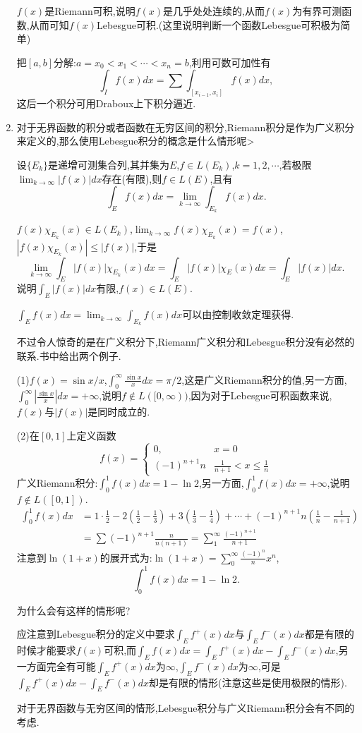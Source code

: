 \documentclass[12pt,a4paper,openany]{book}
\begin{document}
\begin{enumerate}
$f(x)$是Riemann可积,说明$f(x)$是几乎处处连续的,从而$f(x)$为有界可测函数,从而可知$f(x)$Lebesgue可积.(这里说明判断一个函数Lebesgue可积极为简单)

把$[a,b]$分解:$a=x_0<x_1<\cdots<x_n=b$,利用可数可加性有
\[
\int_{I}{f(x)dx} = \sum{\int_{[x_{i-1}, x_i]}{f(x)dx}},
\]
这后一个积分可用Draboux上下积分逼近.

\item 对于无界函数的积分或者函数在无穷区间的积分,Riemann积分是作为广义积分来定义的,那么使用Lebesgue积分的概念是什么情形呢>

设$\{E_k\}$是递增可测集合列,其并集为$E$,$f \in L(E_k)$,$k=1,2,\cdots$,若极限$\lim_{k \rightarrow \infty}{|f(x)|dx}$存在(有限),则$f \in L(E)$,且有
\[
\int_{E}{f(x)dx} = \lim_{k \rightarrow \infty}{\int_{E_k}{f(x)dx}}.
\]

$f(x)\chi_{E_k}(x) \in L(E_k)$,$\lim_{k \rightarrow \infty}{f(x)\chi_{E_k}(x)} = f(x)$,$|f(x)\chi_{E_k}(x)| \le |f(x)|$,于是
\[
\lim_{k \rightarrow \infty}{\int_{E}{|f(x)|\chi_{E_k}(x)dx}} = \int_{E}{|f(x)|\chi_{E}(x)dx}=\int_{E}{|f(x)|dx}.
\]
说明$\int_{E}{|f(x)|dx}$有限,$f(x) \in L(E)$.

$\int_{E}{f(x)dx} = \lim_{k \rightarrow \infty}{\int_{E_k}{f(x)dx}}$可以由控制收敛定理获得.

不过令人惊奇的是在广义积分下,Riemann广义积分和Lebesgue积分没有必然的联系.书中给出两个例子.

(1)$f(x)=\sin{x}/x$,$\int_{0}^{\infty}{\frac{\sin{x}}{x}dx} = \pi/2$,这是广义Riemann积分的值,另一方面,$\int_{0}^{\infty}{|\frac{\sin{x}}{x}|dx} = +\infty$,说明$f \notin L([0, \infty))$,因为对于Lebesgue可积函数来说,$f(x)$与$|f(x)|$是同时成立的.

(2)在$[0,1]$上定义函数
\[
f(x) = \begin{cases}
0, & x=0 \\
(-1)^{n+1}n & \frac{1}{n+1} < x \le \frac{1}{n}
\end{cases}
\]
广义Riemann积分:$\int_{0}^{1}{f(x)dx} = 1 - \ln{2}$,另一方面,$\int_{0}^{1}{f(x)dx} = +\infty$,说明$f \notin L([0,1])$.
\[
\begin{aligned}
\int_{0}^{1}{f(x)dx} &=1 \cdot \frac{1}{2} - 2(\frac{1}{2} - \frac{1}{3}) + 3(\frac{1}{3} - \frac{1}{4}) + \cdots + (-1)^{n+1}n(\frac{1}{n} - \frac{1}{n+1}) \\
&=\sum{(-1)^{n+1}\frac{n}{n(n+1)}}=\sum_{1}^{\infty}{\frac{(-1)^{n+1}}{n+1}}
\end{aligned}
\]
注意到$\ln{(1+x)}$的展开式为:$\ln{(1+x)} = \sum_{0}^{\infty}{\frac{(-1)^n}{n}x^n}$,
\[
\int_{0}^{1}{f(x)dx} = 1 - \ln{2}.
\]

为什么会有这样的情形呢?

应注意到Lebesgue积分的定义中要求$\int_{E}{f^+(x)dx}$与$\int_{E}{f^-(x)dx}$都是有限的时候才能要求$f(x)$可积,而$\int_{E}{f(x)dx} = \int_{E}{f^+(x)dx} - \int_{E}{f^-(x)dx}$,另一方面完全有可能$\int_{E}{f^+(x)dx}$为$\infty$,$\int_{E}{f^-(x)dx}$为$\infty$,可是$\int_{E}{f^+(x)dx} - \int_{E}{f^-(x)dx}$却是有限的情形(注意这些是使用极限的情形).

对于无界函数与无穷区间的情形,Lebesgue积分与广义Riemann积分会有不同的考虑.

\end{enumerate}
\end{document}
